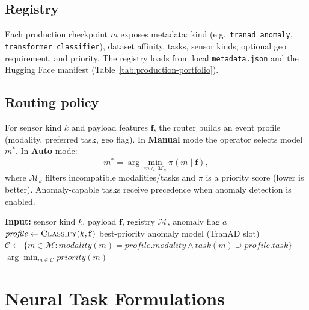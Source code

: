 \subsection{Registry}

Each production checkpoint $m$ exposes metadata: kind (e.g.\ \texttt{tranad\_anomaly}, \texttt{transformer\_classifier}), dataset affinity, tasks, sensor kinds, optional geo requirement, and priority. The registry loads from local \texttt{metadata.json} and the Hugging Face manifest (Table~\ref{tab:production-portfolio}).

\subsection{Routing policy}

For sensor kind $k$ and payload features $\mathbf{f}$, the router builds an event profile (modality, preferred task, geo flag). In \textbf{Manual} mode the operator selects model $m^{*}$. In \textbf{Auto} mode:
\begin{equation}
m^{*} = \arg\min_{m \in \mathcal{M}_k} \pi(m \mid \mathbf{f}),
\end{equation}
where $\mathcal{M}_k$ filters incompatible modalities/tasks and $\pi$ is a priority score (lower is better). Anomaly-capable tasks receive precedence when anomaly detection is enabled.

\begin{algorithm}[H]
\caption{Rule-based model routing (Auto mode)}
\begin{algorithmic}[1]
\State \textbf{Input:} sensor kind $k$, payload $\mathbf{f}$, registry $\mathcal{M}$, anomaly flag $a$
\State $\mathit{profile} \gets \textsc{Classify}(k, \mathbf{f})$
  \State \Return best-priority anomaly model (TranAD slot)
\EndIf
\State $\mathcal{C} \gets \{ m \in \mathcal{M} : \mathit{modality}(m)=\mathit{profile.modality} \land \mathit{task}(m)\supseteq \mathit{profile.task}\}$
\State \Return $\arg\min_{m\in\mathcal{C}} \mathit{priority}(m)$
\end{algorithmic}
\end{algorithm}

\section{Neural Task Formulations}
\label{sec:neural_formulations}



